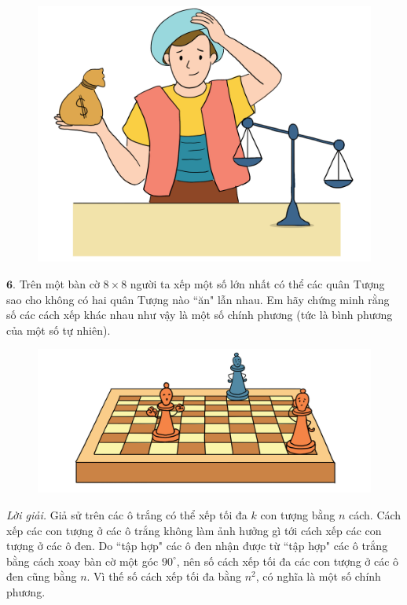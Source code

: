 \begin{multicols}{2}
	\begin{figure}[H]
		\centering
		\vspace*{-5pt}
		\captionsetup{labelformat= empty, justification=centering}
		\includegraphics[width=1\linewidth]{Pi6_bai5}
		\vspace*{-15pt}
	\end{figure}
	$\pmb{6.}$ 	Trên một bàn cờ $8\times8$ người ta xếp một số lớn nhất có thể các quân Tượng sao cho không có hai quân Tượng nào ``ăn" lẫn nhau. Em hãy chứng minh rằng số các cách xếp khác nhau như vậy là một số chính phương (tức là bình phương của một số tự nhiên).
	\begin{figure}[H]
		\centering
		\vspace*{-10pt}
		\captionsetup{labelformat= empty, justification=centering}
		\includegraphics[width=1\linewidth]{Pi6_bai6}
		\vspace*{-15pt}
	\end{figure}
	\textit{Lời giải.} 	Giả sử trên các ô trắng có thể xếp tối đa $k$ con tượng bằng $n$ cách. Cách xếp các con tượng ở các ô trắng không làm ảnh hưởng gì tới cách xếp các con tượng ở các ô đen. Do ``tập hợp" các ô đen nhận được từ ``tập hợp" các ô trắng bằng cách xoay bàn cờ một góc $90^\circ$, nên số cách xếp tối đa các con tượng ở các ô đen cũng bằng $n$. Vì thế số cách xếp tối đa bằng $n^2$, có nghĩa là một số chính phương. 
\end{multicols}
